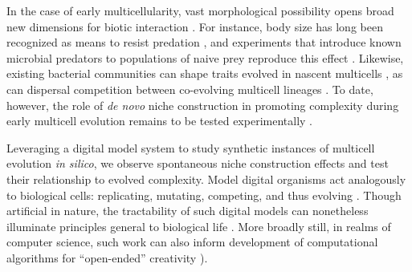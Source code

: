 In the case of early multicellularity, vast morphological possibility opens broad new dimensions for biotic interaction \citep{Carroll2001,bonner1998origins}.
For instance, body size has long been recognized as means to resist predation \citep{niklas2014evolutionary,stanley1973ecological,bonner1988evolution},
and experiments that introduce known microbial predators to populations of naive prey reproduce this effect \citep{boraas1998phagotrophy,yoshida2003rapid,herron2019denovo,pentz2015predator}.
Likewise, existing bacterial communities can shape traits evolved in nascent multicells \citep{quinterogalvis2018exploring}, as can dispersal competition between co-evolving multicell lineages \citep{rose2020metapopulation}.
To date, however, the role of \textit{de novo} niche construction in promoting complexity during early multicell evolution remains to be tested experimentally \citep{goldsby2012task,Joachimczak2012,goldsby2014evolutionary,bozdag2023denovo,ratcliff2012experimental,herron2016origins,kalambokidis2023multispecies,rebolledagomez2016evolution,pineau2024emergence,hammerschmidt2014life,narayanasamy2025metabolically,black2020ecological,rebolledagomez2018cost,ratcliff2013experimental}.


Leveraging a digital model system to study synthetic instances of multicell evolution \textit{in silico}, we observe spontaneous niche construction effects and test their relationship to evolved complexity.
Model digital organisms act analogously to biological cells: replicating, mutating, competing, and thus evolving \citep{pennock2007models}.
Though artificial in nature, the tractability of such digital models can nonetheless illuminate principles general to biological life \citep{adami2000evolution,lenski2003evolutionary,zaman2014coevolution}.
More broadly still, in realms of computer science, such work can also inform development of computational algorithms for ``open-ended'' creativity \citep{dolson2019constructive,soros2014identifying,huizinga2018emergence,lehman2012beyond,nguyen2015,stanley2019open,packard2019overview,taylor2016open,taylor2019evolutionary}).

